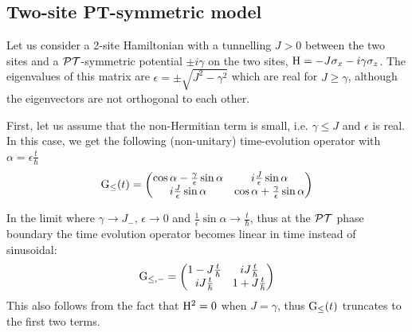 \subsection{Two-site PT-symmetric model}
Let us consider a 2-site Hamiltonian with a tunnelling \(J > 0\) between the two
sites and a \(\mathcal{PT}{}\)-symmetric potential \(\pm i \gamma\) on the two sites, \(
\mathrm{H} = -J \sigma_x -i \gamma \sigma_z\). The eigenvalues of this matrix are
\( \epsilon = \pm \sqrt{J^{2} - \gamma^{2}} \) which are real for \( J \geq
\gamma \), although the eigenvectors are not orthogonal to each other.

First, let us assume that the non-Hermitian term is small, i.e. \( \gamma \leq
J \) and \( \epsilon \) is real. In this case, we get the following
(non-unitary) time-evolution operator with \( \alpha = \epsilon \frac{t}{\hbar}
\)
\begin{equation}
  \mathrm{G}_{\leq} \!\left(t\right) = \begin{pmatrix}
    \cos \alpha - \frac{\gamma}{\epsilon} \sin \alpha &
    i \frac{J}{\epsilon} \sin \alpha \\
    i \frac{J}{\epsilon} \sin \alpha &
    \cos \alpha + \frac{\gamma}{\epsilon} \sin \alpha
  \end{pmatrix}
\end{equation}

In the limit where \( \gamma \rightarrow J_{-} \), \( \epsilon \rightarrow 0 \)
and \( \frac{1}{\epsilon} \sin \alpha \rightarrow \frac{t}{\hbar} \), thus at
the \(\mathcal{PT}{}\) phase boundary the time evolution operator becomes linear in time
instead of sinusoidal:
\begin{equation}
  \mathrm{G}_{\leq,-} = \begin{pmatrix}
    1-J\frac{t}{\hbar} & i J\frac{t}{\hbar} \\
    i J\frac{t}{\hbar} & 1+J\frac{t}{\hbar}
  \end{pmatrix}
\end{equation}
This also follows from the fact that \( \mathrm{H}^{2} = 0\) when \(J = \gamma\),
thus \( \mathrm{G}_{\leq} \!\left(t\right) \) truncates to the first two terms.

